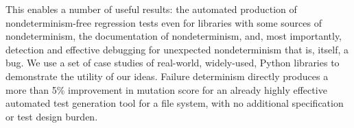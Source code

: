 This enables a number of useful results:
 the automated production of
nondeterminism-free regression tests even for libraries with some
sources of nondeterminism, the documentation of
nondeterminism, and, most importantly, detection and effective debugging for
unexpected nondeterminism that is, itself, a bug.  We use a set
of case studies of real-world, widely-used, Python libraries to demonstrate the
utility of our ideas.  Failure determinism directly
produces a more than 5\% improvement in mutation score for an already highly
effective automated test generation tool for a file system, with no
additional specification or test design burden.